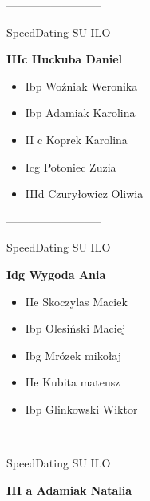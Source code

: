 \documentclass[a4paper,10pt]{article}
\begin{document}
\begin{multicols}{3}
\begin{minipage}[l]{\textwidth}
\begin{itemize}
    \end{itemize}



\end{minipage}



\begin{minipage}[l]{\textwidth}
--------------------------

  \footnotesize{SpeedDating SU ILO}

  \bfseries{IIIc Huckuba Daniel}

  \begin{itemize}
    \item Ibp Woźniak Weronika
    \item Ibp Adamiak Karolina
    \item II c Koprek Karolina
    \item Icg Potoniec Zuzia
    \item IIId Czuryłowicz Oliwia

    \end{itemize}



\end{minipage}



\begin{minipage}[l]{\textwidth}
--------------------------

  \footnotesize{SpeedDating SU ILO}

  \bfseries{Idg Wygoda Ania}

  \begin{itemize}
    \item IIe Skoczylas Maciek
    \item Ibp Olesiński Maciej
    \item Ibg Mrózek mikołaj
    \item IIe Kubita mateusz
    \item Ibp Glinkowski Wiktor

    \end{itemize}



\end{minipage}



\begin{minipage}[l]{\textwidth}
--------------------------

  \footnotesize{SpeedDating SU ILO}

  \bfseries{III a Adamiak Natalia}


\end{minipage}
\end{multicols}
\end{document}
